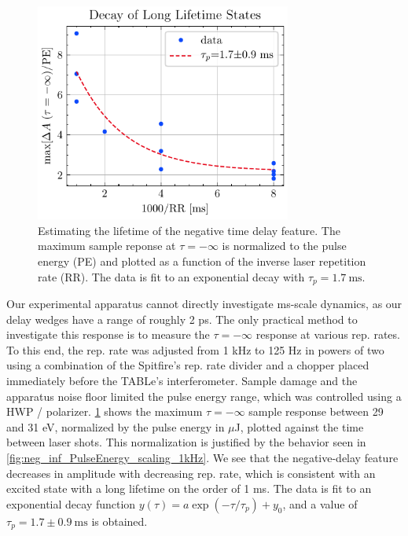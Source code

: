 \begin{figure}
	\centering
	\includegraphics[width=0.75\textwidth]{figures/chap4/long_lifetime_states_PulseEnergy.pdf}
	\caption{Estimating the lifetime of the negative time delay feature. The maximum sample reponse at $\tau = -\infty$ is normalized to the pulse energy (PE) and plotted as a function of the inverse laser repetition rate (RR). The data is fit to an exponential decay with $\tau_p = 1.7 \ \textrm{ms}$.}
	\label{fig:long_lifetime_states}
\end{figure}

Our experimental apparatus cannot directly investigate ms-scale dynamics, as our delay wedges have a range of roughly 2 ps. The only practical method to investigate this response is to measure the $\tau = -\infty$ response at various rep. rates. To this end, the rep. rate was adjusted from 1 kHz to 125 Hz in powers of two using a combination of the Spitfire's rep. rate divider and a chopper placed immediately before the TABLe's interferometer. Sample damage and the apparatus noise floor limited the pulse energy range, which was controlled using a HWP / polarizer. \cref{fig:long_lifetime_states} shows the maximum ${\tau=-\infty}$ sample response between 29 and 31 eV, normalized by the pulse energy in $\mu$J, plotted against the time between laser shots. This normalization is justified by the behavior seen in \cref{fig:neg_inf_PulseEnergy_scaling_1kHz}. We see that the negative-delay feature decreases in amplitude with decreasing rep. rate, which is consistent with an excited state with a long lifetime on the order of 1 ms. The data is fit to an exponential decay function ${y(\tau) = a \exp(-\tau/\tau_p) + y_0}$, and a value of ${\tau_p = 1.7 \pm 0.9 \ \textrm{ms}}$ is obtained.

